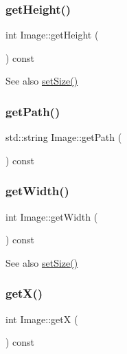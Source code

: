\subsubsection{\texorpdfstring{get\+Height()}{getHeight()}}
{\footnotesize\ttfamily int Image\+::get\+Height (\begin{DoxyParamCaption}{ }\end{DoxyParamCaption}) const}

\begin{DoxySeeAlso}{See also}
\mbox{\hyperlink{class_image_a9e801a7da9c0a032f767dbc362757349}{set\+Size()}} 
\end{DoxySeeAlso}
\mbox{\label{class_image_a1be7f4ed8dae0ce591ac395484ab6fdb}} 
\subsubsection{\texorpdfstring{get\+Path()}{getPath()}}
{\footnotesize\ttfamily std\+::string Image\+::get\+Path (\begin{DoxyParamCaption}{ }\end{DoxyParamCaption}) const}

\mbox{\label{class_image_a36bcae4838228d574738249a87dc4464}} 
\subsubsection{\texorpdfstring{get\+Width()}{getWidth()}}
{\footnotesize\ttfamily int Image\+::get\+Width (\begin{DoxyParamCaption}{ }\end{DoxyParamCaption}) const}

\begin{DoxySeeAlso}{See also}
\mbox{\hyperlink{class_image_a9e801a7da9c0a032f767dbc362757349}{set\+Size()}} 
\end{DoxySeeAlso}
\mbox{\label{class_image_ab48c8233ee01eddacd19aa943a0a6ddc}} 
\subsubsection{\texorpdfstring{get\+X()}{getX()}}
{\footnotesize\ttfamily int Image\+::getX (\begin{DoxyParamCaption}{ }\end{DoxyParamCaption}) const}



